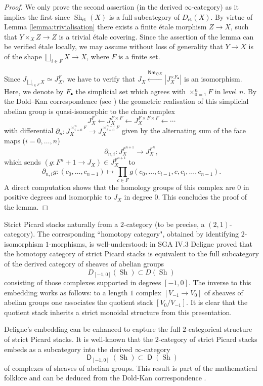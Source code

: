 \documentclass{article}
\DeclareMathOperator{\Sh}{Sh}
\DeclareMathOperator{\D}{\mathsf{D}}
\DeclareMathOperator{\Nm}{\mathsf{Nm}}
\theoremstyle{definition}
\theoremstyle{plain}
\begin{document}
\begin{proof}
We only prove the second assertion (in the derived $\infty$-category) as it implies the first since $\Sh_{\text{\'et}}(X)$ is a full subcategory of $D_{\text{\'et}}(X)$. By virtue of Lemma \ref{lemma:trivialisation} there exists a finite \'etale morphism $Z \to X$, such that $Y \times_X Z \to Z$ is a trivial \'etale covering. Since the assertion of the lemma can be verified \'etale locally, we may assume without loss of generality that $Y \to X$ is of the shape $\bigsqcup_{i \in F} X \to X$, where $F$ is a finite set.

Since $J_{\bigsqcup_{i \in F}X} \simeq J_X^F$, we have to verify that $J_X \xleftarrow{\Nm_{Y/X}} |J_{X}^{\times F_{\bullet}}|$ is an isomorphism. Here, we denote by $F_{\bullet}$ the simplicial set which agrees with $\times_{0=1}^n F$ in level $n$. By the Dold--Kan correspondence (see \cite[Tag 019D]{stacks-project}) the geometric realisation of this simplicial abelian group is quasi-isomorphic to the chain complex
$$J_X^F \leftarrow J_X^{F \times F} \leftarrow J_X^{F \times F \times F} \leftarrow \cdots$$
with differential $\partial_n\colon J_X^{\times_{i=0}^n F} \to J_X^{\times_{i=0}^{n-1} F}$ given by the alternating sum of the face maps ($i = 0,\dots,n$)
$$\partial_{n,i}\colon J_X^{F^{n+1}} \to J_X^{F^n},$$
which sends $(g\colon F^n+1 \to J_X) \in J_X^{F^{n+1}}$ to 
$$\partial_{n,i}g\colon (c_0,\dots,c_{n-1}) \mapsto \prod_{c \in F} g(c_0,\dots,c_{i-1},c,c_{i},\dots,c_{n-1}).$$
A direct computation shows that the homology groups of this complex are $0$ in positive degrees and isomorphic to $J_X$ in degree $0$. This concludes the proof of the lemma.
\end{proof}


Strict Picard stacks naturally from a $2$-category (to be precise, a $(2,1)$-category). The corresponding ``homotopy category", obtained by identifying $2$-isomorphism $1$-morphisms, is well-understood: in SGA IV.3 \cite[XVIII.1.4]{SGA43} Deligne proved that the homotopy category of strict Picard stacks is equivalent to the full subcategory of the derived category of sheaves of abelian groups
$$D_{[-1,0]}(\Sh) \subset D(\Sh)$$
consisting of those complexes supported in degrees $[-1,0]$. The inverse to this embedding works as follows: to a length $1$ complex $[V_{-1} \to V_0]$ of sheaves of abelian groups one associates the quotient stack $[V_0/V_{-1}]$. It is clear that the quotient stack inherits a strict monoidal structure from this presentation.

Deligne's embedding can be enhanced to capture the full $2$-categorical structure of strict Picard stacks. It is well-known that the $2$-category of strict Picard stacks embeds as a subcategory into the derived $\infty$-category 
$$\D_{[-1,0]}(\Sh) \subset \D(\Sh)$$
of complexes of sheaves of abelian groups. This result is part of the mathematical folklore and can be deduced from the Dold-Kan correspondence \cite[Tag 019G]{stacks-project}.
\end{document}
